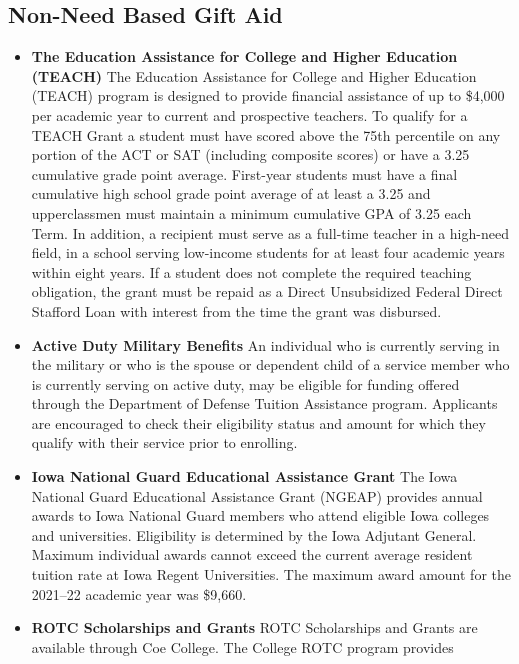 \documentclass[
  letterpaper,
]{scrbook}
\begin{document}
\hypertarget{non-need-based-gift-aid}{%
\subsection{Non-Need Based Gift Aid}\label{non-need-based-gift-aid}}

\begin{itemize}
\item
  \textbf{The Education Assistance for College and Higher Education
  (TEACH)} The Education Assistance for College and Higher Education
  (TEACH) program is designed to provide financial assistance of up to
  \$4,000 per academic year to current and prospective teachers. To
  qualify for a TEACH Grant a student must have scored above the 75th
  percentile on any portion of the ACT or SAT (including composite
  scores) or have a 3.25 cumulative grade point average. First-year
  students must have a final cumulative high school grade point average
  of at least a 3.25 and upperclassmen must maintain a minimum
  cumulative GPA of 3.25 each Term. In addition, a recipient must serve
  as a full-time teacher in a high-need field, in a school serving
  low-income students for at least four academic years within eight
  years. If a student does not complete the required teaching
  obligation, the grant must be repaid as a Direct Unsubsidized Federal
  Direct Stafford Loan with interest from the time the grant was
  disbursed.
\item
  \textbf{Active Duty Military Benefits} An individual who is currently
  serving in the military or who is the spouse or dependent child of a
  service member who is currently serving on active duty, may be
  eligible for funding offered through the Department of Defense Tuition
  Assistance program. Applicants are encouraged to check their
  eligibility status and amount for which they qualify with their
  service prior to enrolling.
\item
  \textbf{Iowa National Guard Educational Assistance Grant} The Iowa
  National Guard Educational Assistance Grant (NGEAP) provides annual
  awards to Iowa National Guard members who attend eligible Iowa
  colleges and universities. Eligibility is determined by the Iowa
  Adjutant General. Maximum individual awards cannot exceed the current
  average resident tuition rate at Iowa Regent Universities. The maximum
  award amount for the 2021--22 academic year was \$9,660.
\item
  \textbf{ROTC Scholarships and Grants} ROTC Scholarships and Grants are
  available through Coe College. The College ROTC program provides

\end{itemize}
\end{document}
